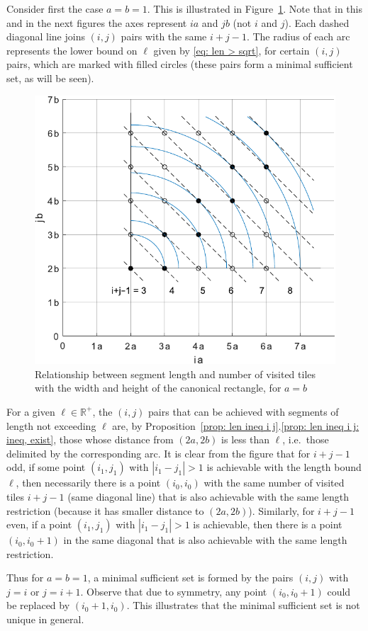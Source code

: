 \documentclass[12pt, a4paper]{article}
\newcommand{\len}{\ell} %
\newcommand{\touched}{visited}
\begin{document}
Consider first the case $a=b=1$. This is illustrated in Figure~\ref{fig: ijLS_1}. Note that in this and in the next figures the axes represent $ia$ and $jb$ (not $i$ and $j$). Each dashed diagonal line joins $(i, j)$ pairs with the same $i+j-1$. The radius of each arc represents the lower bound on $\len$ given by \eqref{eq: len > sqrt}, for certain $(i,j)$ pairs, which are marked with filled circles (these pairs form a minimal sufficient set, as will be seen).

\begin{figure}
\centering%
\includegraphics[width=.7\textwidth]{ijLS_1}%
\caption{Relationship between segment length and number of \touched{} tiles with the width and height of the canonical rectangle, for $a=b$
}%
\label{fig: ijLS_1}%
\end{figure}%

For a given $\len \in \mathbb R^+$, the $(i,j)$ pairs that can be achieved with segments of length not exceeding $\len$ are, by Proposition~\ref{prop: len ineq i j}.\ref{prop: len ineq i j: ineq, exist}, those whose distance from $(2a,2b)$ is less than $\len$, i.e.~those delimited by the corresponding arc. It is clear from the figure that for $i+j-1$ odd, if some point $(i_1,j_1)$ with $|i_1-j_1|>1$ is achievable with the length bound $\len$, then necessarily there is a point $(i_0,i_0)$ with the same number of \touched{} tiles $i+j-1$ (same diagonal line) that is also achievable with the same length restriction (because it has smaller distance to $(2a,2b)$). Similarly, for $i+j-1$ even, if a point $(i_1,j_1)$ with $|i_1-j_1|>1$ is achievable, then there is a point $(i_0,i_0+1)$ in the same diagonal that is also achievable with the same length restriction.

Thus for $a=b=1$, a minimal sufficient set is formed by the pairs $(i,j)$ with $j=i$ or $j=i+1$. Observe that due to symmetry, any point $(i_0,i_0+1)$ could be replaced by $(i_0+1,i_0)$. This illustrates that the minimal sufficient set is not unique in general. 
\end{document}
